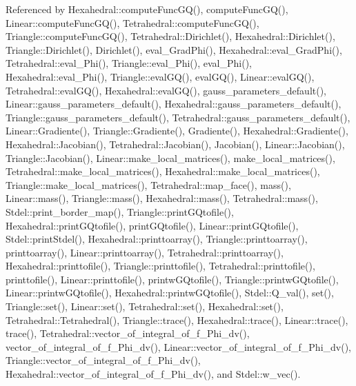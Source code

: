 Referenced by Hexahedral\+::compute\+Func\+G\+Q(), compute\+Func\+G\+Q(), Linear\+::compute\+Func\+G\+Q(), Tetrahedral\+::compute\+Func\+G\+Q(), Triangle\+::compute\+Func\+G\+Q(), Tetrahedral\+::\+Dirichlet(), Hexahedral\+::\+Dirichlet(), Triangle\+::\+Dirichlet(), Dirichlet(), eval\+\_\+\+Grad\+Phi(), Hexahedral\+::eval\+\_\+\+Grad\+Phi(), Tetrahedral\+::eval\+\_\+\+Phi(), Triangle\+::eval\+\_\+\+Phi(), eval\+\_\+\+Phi(), Hexahedral\+::eval\+\_\+\+Phi(), Triangle\+::eval\+G\+Q(), eval\+G\+Q(), Linear\+::eval\+G\+Q(), Tetrahedral\+::eval\+G\+Q(), Hexahedral\+::eval\+G\+Q(), gauss\+\_\+parameters\+\_\+default(), Linear\+::gauss\+\_\+parameters\+\_\+default(), Hexahedral\+::gauss\+\_\+parameters\+\_\+default(), Triangle\+::gauss\+\_\+parameters\+\_\+default(), Tetrahedral\+::gauss\+\_\+parameters\+\_\+default(), Linear\+::\+Gradiente(), Triangle\+::\+Gradiente(), Gradiente(), Hexahedral\+::\+Gradiente(), Hexahedral\+::\+Jacobian(), Tetrahedral\+::\+Jacobian(), Jacobian(), Linear\+::\+Jacobian(), Triangle\+::\+Jacobian(), Linear\+::make\+\_\+local\+\_\+matrices(), make\+\_\+local\+\_\+matrices(), Tetrahedral\+::make\+\_\+local\+\_\+matrices(), Hexahedral\+::make\+\_\+local\+\_\+matrices(), Triangle\+::make\+\_\+local\+\_\+matrices(), Tetrahedral\+::map\+\_\+face(), mass(), Linear\+::mass(), Triangle\+::mass(), Hexahedral\+::mass(), Tetrahedral\+::mass(), Stdel\+::print\+\_\+border\+\_\+map(), Triangle\+::print\+G\+Qtofile(), Hexahedral\+::print\+G\+Qtofile(), print\+G\+Qtofile(), Linear\+::print\+G\+Qtofile(), Stdel\+::print\+Stdel(), Hexahedral\+::printtoarray(), Triangle\+::printtoarray(), printtoarray(), Linear\+::printtoarray(), Tetrahedral\+::printtoarray(), Hexahedral\+::printtofile(), Triangle\+::printtofile(), Tetrahedral\+::printtofile(), printtofile(), Linear\+::printtofile(), printw\+G\+Qtofile(), Triangle\+::printw\+G\+Qtofile(), Linear\+::printw\+G\+Qtofile(), Hexahedral\+::printw\+G\+Qtofile(), Stdel\+::\+Q\+\_\+val(), set(), Triangle\+::set(), Linear\+::set(), Tetrahedral\+::set(), Hexahedral\+::set(), Tetrahedral\+::\+Tetrahedral(), Triangle\+::trace(), Hexahedral\+::trace(), Linear\+::trace(), trace(), Tetrahedral\+::vector\+\_\+of\+\_\+integral\+\_\+of\+\_\+f\+\_\+\+Phi\+\_\+dv(), vector\+\_\+of\+\_\+integral\+\_\+of\+\_\+f\+\_\+\+Phi\+\_\+dv(), Linear\+::vector\+\_\+of\+\_\+integral\+\_\+of\+\_\+f\+\_\+\+Phi\+\_\+dv(), Triangle\+::vector\+\_\+of\+\_\+integral\+\_\+of\+\_\+f\+\_\+\+Phi\+\_\+dv(), Hexahedral\+::vector\+\_\+of\+\_\+integral\+\_\+of\+\_\+f\+\_\+\+Phi\+\_\+dv(), and Stdel\+::w\+\_\+vec().

